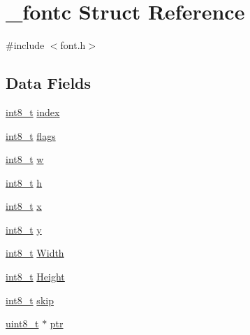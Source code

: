 \hypertarget{struct__fontc}{}\section{\+\_\+fontc Struct Reference}
\label{struct__fontc}


{\ttfamily \#include $<$font.\+h$>$}

\subsection*{Data Fields}
\begin{DoxyCompactItemize}
\item 
\hyperlink{earth2wireframe_8c_aef44329758059c91c76d334e8fc09700}{int8\+\_\+t} \hyperlink{struct__fontc_a7cc0370744ff7ea964054d36917c9a2f}{index}
\item 
\hyperlink{earth2wireframe_8c_aef44329758059c91c76d334e8fc09700}{int8\+\_\+t} \hyperlink{struct__fontc_aa74d9a5513b529b5e444f283afea40ef}{flags}
\item 
\hyperlink{earth2wireframe_8c_aef44329758059c91c76d334e8fc09700}{int8\+\_\+t} \hyperlink{struct__fontc_a9c2af0354d2b2009e7b6684e25fd479b}{w}
\item 
\hyperlink{earth2wireframe_8c_aef44329758059c91c76d334e8fc09700}{int8\+\_\+t} \hyperlink{struct__fontc_a9feb8c838dfc1d4eebb15c8e53981944}{h}
\item 
\hyperlink{earth2wireframe_8c_aef44329758059c91c76d334e8fc09700}{int8\+\_\+t} \hyperlink{struct__fontc_ad15d00ed46ebe52a085cf05b5ca5da90}{x}
\item 
\hyperlink{earth2wireframe_8c_aef44329758059c91c76d334e8fc09700}{int8\+\_\+t} \hyperlink{struct__fontc_aebbde0dc41068722ee1a69f4a56478a4}{y}
\item 
\hyperlink{earth2wireframe_8c_aef44329758059c91c76d334e8fc09700}{int8\+\_\+t} \hyperlink{struct__fontc_ae3c802e1c35ae9a4e37c8eb2e9644325}{Width}
\item 
\hyperlink{earth2wireframe_8c_aef44329758059c91c76d334e8fc09700}{int8\+\_\+t} \hyperlink{struct__fontc_a98f97c237dfb1027c38813a17ef6dcd6}{Height}
\item 
\hyperlink{earth2wireframe_8c_aef44329758059c91c76d334e8fc09700}{int8\+\_\+t} \hyperlink{struct__fontc_a44c94e91afa006cb2ffe55a99b3e2d3c}{skip}
\item 
\hyperlink{send_8c_aba7bc1797add20fe3efdf37ced1182c5}{uint8\+\_\+t} $\ast$ \hyperlink{struct__fontc_a60a3fef5ccd80dff543aac3f22f74876}{ptr}
\end{DoxyCompactItemize}



